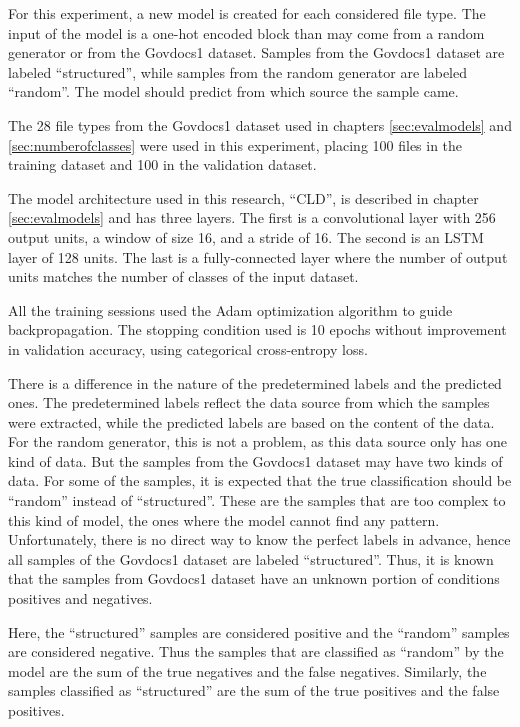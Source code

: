 
For this experiment, a new model is created for each considered file type. The input of the model is a one-hot encoded block than may come from a random generator or from the Govdocs1 dataset. Samples from the Govdocs1 dataset are labeled ``structured'', while samples from the random generator are labeled ``random''. The model should predict from which source the sample came.

The 28 file types from the Govdocs1 dataset \cite{garfinkel_bringing_2009} used in chapters \ref{sec:evalmodels} and \ref{sec:numberofclasses} were used in this experiment, placing 100 files in the training dataset and 100 in the validation dataset.


The model architecture used in this research, ``CLD'', is described in chapter \ref{sec:evalmodels} and has three layers. The first is a convolutional layer with 256 output units, a window of size 16, and a stride of 16. The second is an LSTM layer of 128 units. The last is a fully-connected layer where the number of output units matches the number of classes of the input dataset.

All the training sessions used the Adam \cite{kingma_adam:_2014}
optimization algorithm to guide backpropagation.
The stopping condition used is 10 epochs without improvement in validation accuracy, using categorical cross-entropy loss.


There is a difference in the nature of the predetermined labels and the predicted ones. The predetermined labels reflect the data source from which the samples were extracted, while the predicted labels are based on the content of the data. For the random generator, this is not a problem, as this data source only has one kind of data. But the samples from the Govdocs1 dataset may have two kinds of data. For some of the samples, it is expected that the true classification should be ``random'' instead of ``structured''. These are the samples that are too complex to this kind of model, the ones where the model cannot find any pattern. Unfortunately, there is no direct way to know the perfect labels in advance, hence all samples of the Govdocs1 dataset are labeled ``structured''. Thus, it is known that the samples from Govdocs1 dataset have an unknown portion of conditions positives and negatives.

Here, the ``structured'' samples are considered positive and the ``random'' samples are considered negative. Thus the samples that are classified as ``random'' by the model are the sum of the true negatives and the false negatives. Similarly, the samples classified as ``structured'' are the sum of the true positives and the false positives.

